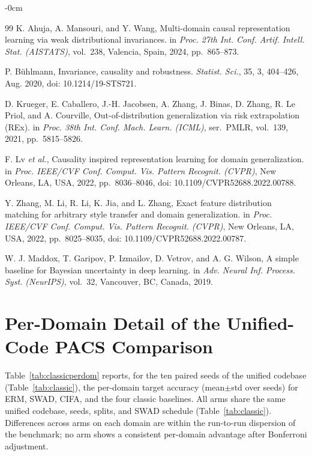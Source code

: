 \documentclass[electronics,article,submit,moreauthors]{Definitions/mdpi}
\newcommand{\add}[1]{\textcolor{addblue}{#1}}
\newcommand{\del}[1]{\textcolor{delred}{\st{#1}}}
\def\add#1{#1}
\def\del#1{}
\begin{document}
\begin{adjustwidth}{-\extralength}{0cm}
\begin{thebibliography}{99}
K. Ahuja, A. Mansouri, and Y. Wang, Multi-domain causal representation learning via weak distributional invariances. in \emph{Proc. 27th Int. Conf. Artif. Intell. Stat. (AISTATS)}, vol.~238, Valencia, Spain, 2024, pp.~865--873.


P. B\"uhlmann, Invariance, causality and robustness. \emph{Statist. Sci.}, 35, 3, 404--426, Aug. 2020, doi: 10.1214/19-STS721.


D. Krueger, E. Caballero, J.-H. Jacobsen, A. Zhang, J. Binas, D. Zhang, R. Le Priol, and A. Courville, Out-of-distribution generalization via risk extrapolation (REx). in \emph{Proc. 38th Int. Conf. Mach. Learn. (ICML)}, ser.~PMLR, vol.~139, 2021, pp.~5815--5826.


F. Lv \emph{et al.}, Causality inspired representation learning for domain generalization. in \emph{Proc. IEEE/CVF Conf. Comput. Vis. Pattern Recognit. (CVPR)}, New Orleans, LA, USA, 2022, pp.~8036--8046, doi: 10.1109/CVPR52688.2022.00788.


Y. Zhang, M. Li, R. Li, K. Jia, and L. Zhang, Exact feature distribution matching for arbitrary style transfer and domain generalization. in \emph{Proc. IEEE/CVF Conf. Comput. Vis. Pattern Recognit. (CVPR)}, New Orleans, LA, USA, 2022, pp.~8025--8035, doi: 10.1109/CVPR52688.2022.00787.


W. J. Maddox, T. Garipov, P. Izmailov, D. Vetrov, and A. G. Wilson, A simple baseline for Bayesian uncertainty in deep learning. in \emph{Adv. Neural Inf. Process. Syst. (NeurIPS)}, vol.~32, Vancouver, BC, Canada, 2019.

\end{thebibliography}


\appendixstart
\appendix
\section{Per-Domain Detail of the Unified-Code PACS Comparison}

Table~\ref{tab:classicperdom} reports, for the ten paired seeds of the unified codebase (Table~\ref{tab:classic}), the per-domain target accuracy (mean$\pm$std over seeds) for ERM, SWAD, CIFA, and the four classic baselines. \del{All six learned arms share one codebase, seeds, deterministic splits, and the identical SWAD schedule.}\add{All arms share the same unified codebase, seeds, splits, and SWAD schedule (Table~\ref{tab:classic}).} Differences across arms on each domain are within the run-to-run dispersion of the benchmark; no arm shows a consistent per-domain advantage after Bonferroni adjustment.


\end{adjustwidth}
\end{document}
